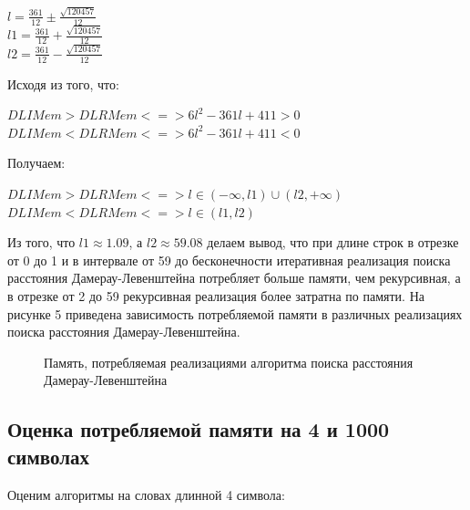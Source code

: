 \documentclass[a4paper, 14pt]{article}
\begin{document}
\begin{flushleft}
\begin{center}
		$l = \frac{361}{12} \pm \frac{\sqrt{120457}}{12}$ \\
		$l1 = \frac{361}{12} + \frac{\sqrt{120457}}{12}$ \\
		$l2 = \frac{361}{12} - \frac{\sqrt{120457}}{12}$ \\
		\begin{flushleft}
		Исходя из того, что:\\
		\end{flushleft}
		$DLIMem > DLRMem <=> 6l^2 - 361l + 411 > 0$\\
		$DLIMem < DLRMem <=> 6l^2 - 361l + 411 < 0$\\
		\begin{flushleft}
		Получаем:\\
		\end{flushleft}		
		$DLIMem > DLRMem <=> l \in (-\infty, l1) \cup (l2, +\infty)$\\
		$DLIMem < DLRMem <=> l \in (l1, l2)$
		\end{center}
		\begin{flushleft}
		Из того, что $l1 \approx 1.09$, а $l2 \approx 59.08$ делаем вывод, что при длине строк в отрезке от 0 до 1  и в интервале от 59 до бесконечности итеративная реализация поиска расстояния Дамерау-Левенштейна потребляет больше памяти, чем рекурсивная, а в отрезке от 2 до 59 рекурсивная реализация более затратна по памяти. На рисунке 5 приведена зависимость потребляемой памяти в различных реализациях поиска расстояния Дамерау-Левенштейна.
		\end{flushleft}
  \end{flushleft}
        \begin{figure}[h]
			\caption{Память, потребляемая реализациями алгоритма поиска расстояния Дамерау-Левенштейна}
			\label{ris:image}
		\end{figure}
	\subsection{Оценка потребляемой памяти на 4 и 1000 символах}	
	Оценим алгоритмы на словах длинной 4 символа:\\
\end{document}
